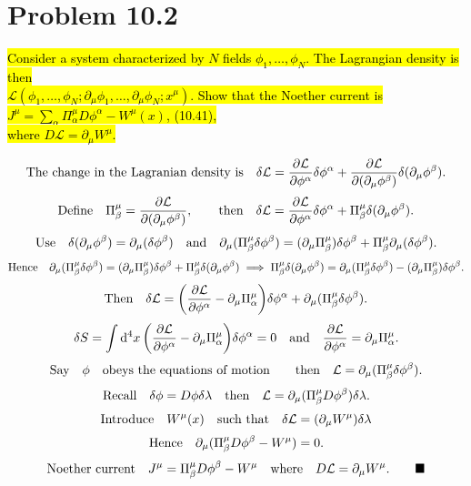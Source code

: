 \documentclass{article}
\begin{document}
\section*{Problem 10.2}
\begin{quoting}
  \hl{Consider a system characterized by $N$ fields $\phi_1,\dots,\phi_N$. The Lagrangian density is then\\ $\mathcal{L}(\phi_1,\dots,\phi_N;\partial_\mu \phi_1,\dots,\partial_\mu \phi_N;x^\mu)$. Show that the Noether current is $J^\mu=\sum_\alpha \Pi_\alpha^\mu  D\phi^\alpha-W^\mu(x)$, (10.41),\\ where $D\mathcal{L}=\partial_\mu W^\mu$.}
\end{quoting}

\[\qq*{The change in the Lagranian density is}\delta\mathcal{L}=\pdv{\mathcal{L}}{\phi^\alpha}\delta\phi^\alpha+\pdv{\mathcal{L}}{(\partial_\mu \phi^\beta)}\delta(\partial_\mu \phi^\beta).\]
\[\qq*{Define}\Pi^\mu_\beta=\pdv{\mathcal{L}}{(\partial_\mu \phi^\beta)}\qcomma \qthen \delta\mathcal{L}=\pdv{\mathcal{L}}{\phi^\alpha}\delta\phi^\alpha+\Pi^\mu_\beta \delta(\partial_\mu \phi^\beta).\]
\[\qq*{Use}\delta(\partial_\mu \phi^\beta)=\partial_\mu (\delta\phi^\beta)\qand\partial_\mu (\Pi^\mu_\beta \delta\phi^\beta)=(\partial_\mu \Pi^\mu_\beta) \delta\phi^\beta+\Pi^\mu_\beta \partial_\mu (\delta\phi^\beta).\]
\[\qq*{Hence}\partial_\mu (\Pi^\mu_\beta \delta\phi^\beta)=(\partial_\mu \Pi^\mu_\beta) \delta\phi^\beta+\Pi^\mu_\beta \delta(\partial_\mu \phi^\beta)\implies\Pi^\mu_\beta \delta(\partial_\mu \phi^\beta)=\partial_\mu (\Pi^\mu_\beta \delta\phi^\beta)-(\partial_\mu \Pi^\mu_\beta) \delta\phi^\beta.\]
\[\qq*{Then}\delta\mathcal{L}=\pqty{\pdv{\mathcal{L}}{\phi^\alpha}-\partial_\mu \Pi^\mu_\alpha}\delta\phi^\alpha+\partial_\mu (\Pi^\mu_\beta \delta\phi^\beta).\]
\[\delta S=\int\dd[4]{x}\pqty{\pdv{\mathcal{L}}{\phi^\alpha}-\partial_\mu \Pi^\mu_\alpha}\delta\phi^\alpha=0\qand\pdv{\mathcal{L}}{\phi^\alpha}=\partial_\mu \Pi^\mu_\alpha.\]
\[\qq*{Say}\phi\qq{obeys the equations of motion}\qthen \mathcal{L}=\partial_\mu (\Pi^\mu_\beta \delta\phi^\beta).\]
\[\qq*{Recall}\delta\phi=D\phi\delta\lambda\qthen\mathcal{L}=\partial_\mu (\Pi^\mu_\beta D\phi^\beta) \delta\lambda.\]
\[\qq*{Introduce}W^\mu(x)\qq{such that}\delta\mathcal{L}=(\partial_\mu W^\mu)\delta\lambda\]
\[\qq*{Hence}\partial_\mu (\Pi^\mu_\beta D\phi^\beta-W^\mu)=0.\]
\[\qq*{Noether current} J^\mu=\Pi^\mu_\beta D\phi^\beta-W^\mu\qq{where}D\mathcal{L}=\partial_\mu W^\mu.\qquad\blacksquare\]
\end{document}
